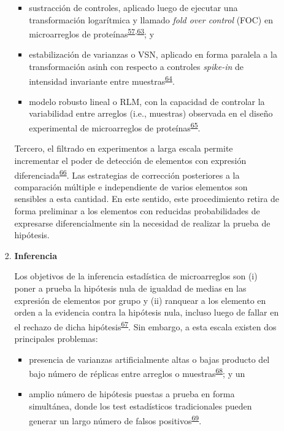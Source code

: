 \documentclass[]{article}
\providecommand{\tightlist}{%
  \setlength{\itemsep}{0pt}\setlength{\parskip}{0pt}}
\begin{document}
\begin{enumerate}
\begin{enumerate}
\begin{enumerate}
      \begin{itemize}
      \tightlist
      \item
        sustracción de controles, aplicado luego de ejecutar una
        transformación logarítmica y llamado \emph{fold over control}
        (FOC) en microarreglos de
        proteínas\textsuperscript{\protect\hyperlink{ref-King2015FOC}{57},\protect\hyperlink{ref-arevalo2016}{63}};
        y
      \item
        estabilización de varianzas o VSN, aplicado en forma paralela a
        la transformación asinh con respecto a controles \emph{spike-in}
        de intensidad invariante entre
        muestras\textsuperscript{\protect\hyperlink{ref-huber2002vsn}{64}}.
      \item
        modelo robusto lineal o RLM, con la capacidad de controlar la
        variabilidad entre arreglos (i.e., muestras) observada en el
        diseño experimental de microarreglos de
        proteínas\textsuperscript{\protect\hyperlink{ref-sboner2009rlm}{65}}.
      \end{itemize}

      Tercero, el filtrado en experimentos a larga escala permite
      incrementar el poder de detección de elementos con expresión
      diferenciada\textsuperscript{\protect\hyperlink{ref-bourgon2010filter}{66}}.
      Las estrategias de corrección posteriores a la comparación
      múltiple e independiente de varios elementos son sensibles a esta
      cantidad. En este sentido, este procedimiento retira de forma
      preliminar a los elementos con reducidas probabilidades de
      expresarse diferencialmente sin la necesidad de realizar la prueba
      de hipótesis.
    \item
      \textbf{Inferencia}

      Los objetivos de la inferencia estadística de microarreglos son
      (i) poner a prueba la hipótesis nula de igualdad de medias en las
      expresión de elementos por grupo y (ii) ranquear a los elemento en
      orden a la evidencia contra la hipótesis nula, incluso luego de
      fallar en el rechazo de dicha
      hipótesis\textsuperscript{\protect\hyperlink{ref-smyth2004ebayes}{67}}.
      Sin embargo, a esta escala existen dos principales problemas:

      \begin{itemize}
      \tightlist
      \item
        presencia de varianzas artificialmente altas o bajas producto
        del bajo número de réplicas entre arreglos o
        muestras\textsuperscript{\protect\hyperlink{ref-baldi2001cybert}{68}};
        y un
      \item
        amplio número de hipótesis puestas a prueba en forma simultánea,
        donde los test estadísticos tradicionales pueden generar un
        largo número de falsos
        positivos\textsuperscript{\protect\hyperlink{ref-kayala2012cyber}{69}}.
      \end{itemize}


\end{enumerate}
\end{enumerate}
\end{enumerate}
\end{document}
